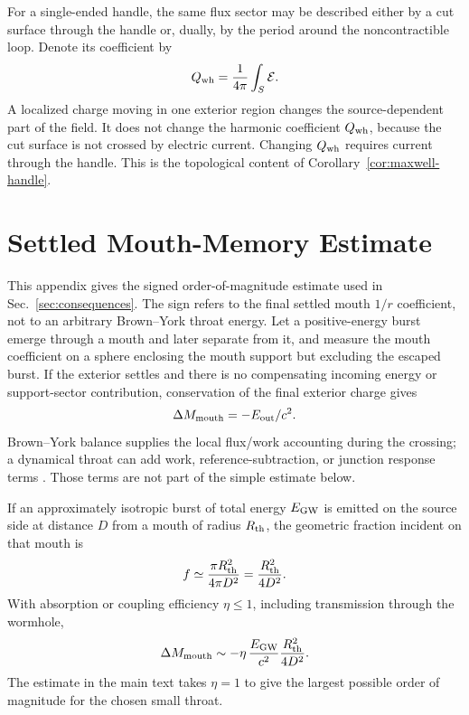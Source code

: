 \documentclass[aps,prd,10pt,onecolumn,nofootinbib,superscriptaddress,floatfix]{revtex4-2}
\begin{document}
For a single-ended handle, the same flux sector may be described either by a cut
surface through the handle or, dually, by the period around the noncontractible
loop.  Denote its coefficient by
\begin{equation}
  Q_{\rm wh}=\frac{1}{4\pi}\int_S\mathcal E .
\end{equation}
A localized charge moving in one exterior region changes the source-dependent
part of the field.  It does not change the harmonic coefficient $Q_{\rm wh}$,
because the cut surface is not crossed by electric current.  Changing
$Q_{\rm wh}$ requires current through the handle.  This is the
topological content of Corollary~\ref{cor:maxwell-handle}.

\section{Settled Mouth-Memory Estimate}
\label{app:backreaction-sign}

This appendix gives the signed order-of-magnitude estimate used in
Sec.~\ref{sec:consequences}.  The sign refers to the final settled mouth
$1/r$ coefficient, not to an arbitrary Brown--York throat energy.  Let a
positive-energy burst emerge through a mouth and later separate from it, and
measure the mouth coefficient on a sphere enclosing the mouth support but
excluding the escaped burst.  If the exterior settles and there is no
compensating incoming energy or support-sector contribution, conservation of
the final exterior charge gives
\begin{equation}
  \Delta M_{\rm mouth}=-E_{\rm out}/c^2 .
\end{equation}
Brown--York balance supplies the local flux/work accounting during the
crossing; a dynamical throat can add work, reference-subtraction, or junction
response terms \cite{Visser1995LorentzianWormholes}.  Those terms are not part
of the simple estimate below.

If an approximately isotropic burst of total energy $E_{\rm GW}$ is emitted on
the source side at distance $D$ from a mouth of radius $R_{\rm th}$, the
geometric fraction incident on that mouth is
\begin{equation}
  f\simeq \frac{\pi R_{\rm th}^2}{4\pi D^2}
  =\frac{R_{\rm th}^2}{4D^2}.
\end{equation}
With absorption or coupling efficiency $\eta\le1$, including transmission
through the wormhole,
\begin{equation}
  \Delta M_{\rm mouth}
  \sim
  -\eta\,\frac{E_{\rm GW}}{c^2}\frac{R_{\rm th}^2}{4D^2}.
\end{equation}
The estimate in the main text takes $\eta=1$ to give the largest possible
order of magnitude for the chosen small throat.
\end{document}

